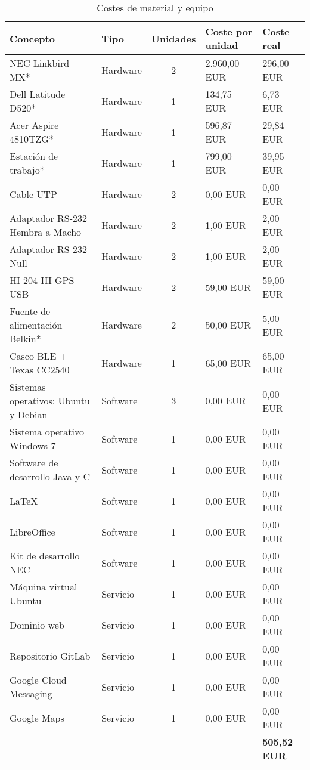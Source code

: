 \begin{table}[ht]
	\centering
	\caption{Costes de material y equipo}\label{tab:presupuestoMaterial}
	\begin{tabular}{llcll}
		\toprule
		\textbf{Concepto} & \textbf{Tipo} & \textbf{Unidades} &
			\textbf{Coste por unidad} & \textbf{Coste real} \\
		\midrule
		NEC Linkbird MX* & Hardware & 2 & 2.960,00 EUR & 296,00 EUR \\
		Dell Latitude D520* & Hardware & 1 & 134,75 EUR & 6,73 EUR \\
		Acer Aspire 4810TZG* & Hardware & 1 & 596,87 EUR & 29,84 EUR \\
		Estación de trabajo* & Hardware & 1 & 799,00 EUR & 39,95 EUR \\
		Cable UTP & Hardware & 2 & 0,00 EUR & 0,00 EUR \\
		Adaptador RS-232 Hembra a Macho & Hardware & 2 & 1,00 EUR & 2,00 EUR \\
		Adaptador RS-232 Null & Hardware & 2 & 1,00 EUR & 2,00 EUR \\
		HI 204-III GPS USB & Hardware & 2 & 59,00 EUR & 59,00 EUR \\
		Fuente de alimentación Belkin* & Hardware & 2 & 50,00 EUR & 5,00 EUR \\
		Casco BLE + Texas CC2540 & Hardware & 1 & 65,00 EUR & 65,00 EUR \\
		Sistemas operativos: Ubuntu y Debian & Software & 3 & 0,00 EUR & 0,00 EUR \\
		Sistema operativo Windows 7 & Software & 1 & 0,00 EUR & 0,00 EUR \\
		Software de desarrollo Java y C & Software & 1 & 0,00 EUR & 0,00 EUR \\
		LaTeX & Software & 1 & 0,00 EUR & 0,00 EUR \\
		LibreOffice & Software & 1 & 0,00 EUR & 0,00 EUR \\
		Kit de desarrollo NEC & Software & 1 & 0,00 EUR & 0,00 EUR \\
		Máquina virtual Ubuntu & Servicio & 1 & 0,00 EUR & 0,00 EUR \\
		Dominio web & Servicio & 1 & 0,00 EUR & 0,00 EUR \\
		Repositorio GitLab & Servicio & 1 & 0,00 EUR & 0,00 EUR \\
		Google Cloud Messaging & Servicio & 1 & 0,00 EUR & 0,00 EUR \\
		Google Maps & Servicio & 1 & 0,00 EUR & 0,00 EUR \\
		& & & & \textbf{505,52 EUR}\\
		\bottomrule
	\end{tabular}
\end{table}
